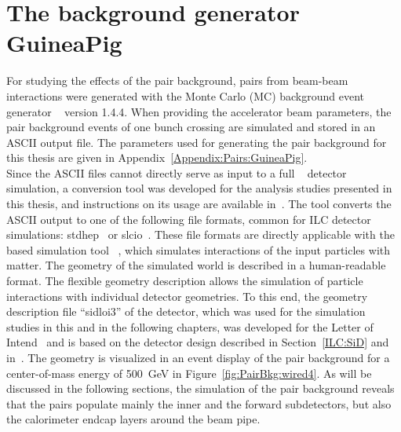 \section{The background generator GuineaPig}
\label{PairBkg:GuineaPig}
For studying the effects of the pair background, \positron\electron pairs from beam-beam interactions were generated with the Monte Carlo (MC) background event generator \guineapig~\cite{Schulte:1997nga} version 1.4.4. 
When providing the accelerator beam parameters, the pair background events of one bunch crossing are simulated and stored in an ASCII output file.
The parameters used for generating the pair background for this thesis are given in Appendix~\ref{Appendix:Pairs:GuineaPig}. 
\\Since the ASCII files cannot directly serve as input to a full \geant~\cite{geant_ref,geant_ref2} detector simulation, a conversion tool was developed for the analysis studies presented in this thesis, and instructions on its usage are available in~\cite{Confluence}. 
The tool converts the ASCII output to one of the following file formats, common for ILC detector simulations: stdhep~\cite{stdhep} or slcio~\cite{LCIO}.
These file formats are directly applicable with the \geant based simulation tool \slic~\cite{Graf:2006ei}, which simulates interactions of the input particles with matter.
The geometry of the simulated world is described in a human-readable format.
The flexible geometry description allows the simulation of particle interactions with individual detector geometries.
To this end, the geometry description file ``sidloi3'' of the \sid detector, which was used for the simulation studies in this and in the following chapters, was developed for the \sid Letter of Intend~\cite{LoI} and is based on the detector design described in Section~\ref{ILC:SiD} and in~\cite[p. 69 ff]{TDR4}.
The \sid geometry is visualized in an event display of the pair background for a center-of-mass energy of \SI{500}{\GeV} in Figure~\ref{fig:PairBkg:wired4}.
As will be discussed in the following sections, the simulation of the pair background reveals that the pairs populate mainly the inner and the forward \sid subdetectors, but also the calorimeter endcap layers around the beam pipe.
